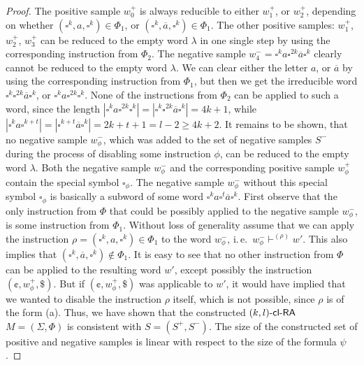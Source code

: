 \begin{proof}
The positive sample $w_0^+$ is always reducible to either $w_1^+$,
or $w_2^+$, depending on whether $(\square^k, a, \square^k) \in \Phi_1$,
or $(\square^k, \overline{a}, \square^k) \in \Phi_1$.
The other positive samples: $w_1^+$, $w_2^+$, $w_3^+$ can be reduced
to the empty word $\lambda$ in one single step by using the corresponding 
instruction from $\Phi_2$. The negative sample 
$w_4^- = \square^k a \square^{2k} \overline{a} \square^k$ clearly
cannot be reduced to the empty word $\lambda$. We can clear either 
the letter $a$, or $\overline{a}$ by using the corresponding 
instruction from $\Phi_1$, but then we get the irreducible 
word $\square^k \square^{2k} \overline{a} \square^k$, or 
$\square^k a \square^{2k} \square^k$. None of the instructions from $\Phi_2$ 
can be applied to such a word, since the length 
$|\square^k a \square^{2k} \square^k| = 
|\square^k \square^{2k} \overline{a} \square^k| = 4k + 1$,
while $|\square^k a \square^{k+t}| = |\square^{k+t} \overline{a} \square^k| =
2k + t + 1 = l - 2 \ge 4k + 2$.
It remains to be shown, that no negative sample $w_{\phi}^-$, which was added 
to the set of negative samples $S^-$ during the process of disabling 
some instruction $\phi$, can be reduced to the empty word $\lambda$. 
Both the negative sample $w_{\phi}^-$ and the corresponding positive 
sample $w_{\phi}^+$ contain the special symbol $\square_{\phi}$. 
The negative sample $w_{\phi}^-$ without this special symbol 
$\square_{\phi}$ is basically a subword of some word 
$\square^k a \square^t \overline{a} \square^k$.
First observe that the only instruction from $\Phi$ that could be possibly applied 
to the negative sample $w_{\phi}^-$, is some instruction from $\Phi_1$. Without 
loss of generality assume that we can apply the instruction
$\rho = (\square^k, a, \square^k) \in \Phi_1$ to the word $w_{\phi}^-$, i.\,e.\
$w_{\phi}^- \vdash^{(\rho)} w'$. 
This also implies that $(\square^k, \overline{a}, \square^k) \notin \Phi_1$.
It is easy to see that no other instruction 
from $\Phi$ can be applied to the resulting word $w'$, except possibly 
the instruction $(\cent, w_{\phi}^+, \$)$. But if $(\cent, w_{\phi}^+, \$)$ was
applicable to $w'$, it would have implied that we wanted to disable the
instruction $\rho$ itself, which is not possible, since $\rho$ is of 
the form (a). Thus, we have shown that the constructed $\mbox{\sf $(k,l)$-\mbox{\sf cl-RA\/}}$ $M = (\Sigma, \Phi)$ 
is consistent with $S = (S^+, S^-)$. The size of the constructed set of positive 
and negative samples is linear with respect to the size of the formula $\psi$.


\end{proof}
